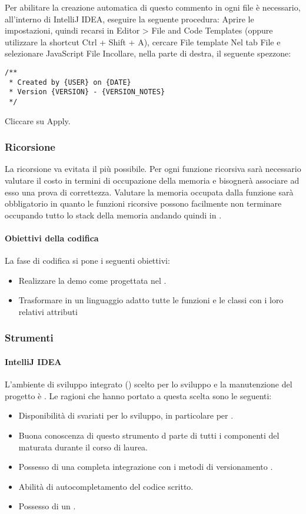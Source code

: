 Per abilitare la creazione automatica di questo commento in ogni file è necessario, all'interno di IntelliJ IDEA, eseguire la seguente procedura:
Aprire le impostazioni, quindi recarsi in Editor > File and Code Templates (oppure  utilizzare la shortcut Ctrl + Shift + A), cercare File template
Nel tab File e selezionare JavaScript File
Incollare, nella parte di destra, il seguente spezzone:
\begin{lstlisting}
/**
 * Created by {USER} on {DATE}
 * Version {VERSION} - {VERSION_NOTES}
 */
\end{lstlisting}
Cliccare su Apply.
  
\subsubsection{Ricorsione}
La ricorsione va evitata il più possibile. Per ogni funzione ricorsiva sarà necessario valutare il costo in termini di occupazione della memoria e bisognerà associare ad esso una prova di correttezza.
Valutare la memoria occupata dalla funzione sarà obbligatorio in quanto le funzioni ricorsive possono facilmente non terminare occupando tutto lo stack della memoria andando quindi in .

\paragraph{Obiettivi della codifica}
La fase di codifica si pone i seguenti obiettivi:
\begin{itemize}
\item Realizzare la demo come progettata nel \DDP.
\item Trasformare in un linguaggio adatto tutte le funzioni e le classi con i loro relativi attributi 
\end{itemize}

\subsubsection{Strumenti}

\paragraph{IntelliJ IDEA}
L'ambiente di sviluppo integrato () scelto per lo sviluppo e la manutenzione del progetto è . Le ragioni che hanno portato a questa scelta sono le seguenti:
\begin{itemize}
\item Disponibilità di svariati  per lo sviluppo, in particolare per .
\item Buona conoscenza di questo strumento d parte di tutti i componenti del  maturata durante il corso di laurea.
\item Possesso di una completa integrazione con i metodi di versionamento .
\item Abilità di autocompletamento del codice  scritto.
\item Possesso di un  .
\end{itemize}

